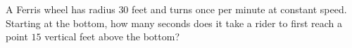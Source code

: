 A Ferris wheel has radius $30$ feet and turns once per minute at constant speed. Starting at the bottom, how many seconds does it take a rider to first reach a point $15$ vertical feet above the bottom?
